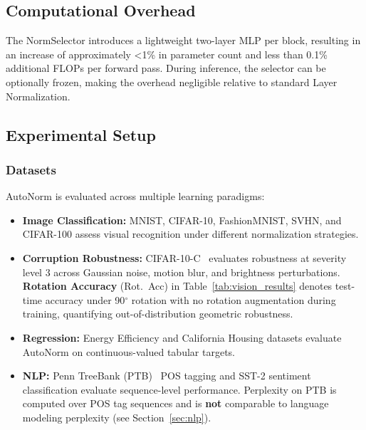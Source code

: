 \documentclass[final,3p,times,twocolumn]{elsarticle}
\begin{document}
\subsection{Computational Overhead}
The NormSelector introduces a lightweight two-layer MLP per block,
resulting in an increase of approximately <1\% in parameter count and
less than 0.1\% additional FLOPs per forward pass. During inference,
the selector can be optionally frozen, making the overhead negligible
relative to standard Layer Normalization.

\subsection{Experimental Setup}

\subsubsection{Datasets}
\label{sec:datasets}

AutoNorm is evaluated across multiple learning paradigms:

\begin{itemize}
    \item \textbf{Image Classification:} MNIST, CIFAR-10, FashionMNIST,
      SVHN, and CIFAR-100 assess visual recognition under different
      normalization strategies.

    \item \textbf{Corruption Robustness:} CIFAR-10-C~\cite{hendrycks2019benchmarking}
      evaluates robustness at severity level 3 across Gaussian noise,
      motion blur, and brightness perturbations. \textbf{Rotation
      Accuracy} (Rot.\ Acc) in Table~\ref{tab:vision_results} denotes
      test-time accuracy under 90$^\circ$ rotation with no rotation
      augmentation during training, quantifying out-of-distribution
      geometric robustness.

    \item \textbf{Regression:} Energy Efficiency and California Housing
      datasets evaluate AutoNorm on continuous-valued tabular targets.

    \item \textbf{NLP:} Penn TreeBank (PTB)~\cite{marcus1993ptb} POS
      tagging and SST-2 sentiment classification evaluate sequence-level
      performance. Perplexity on PTB is computed over POS tag sequences
      and is \textbf{not} comparable to language modeling perplexity
      (see Section~\ref{sec:nlp}).
\end{itemize}
\end{document}
